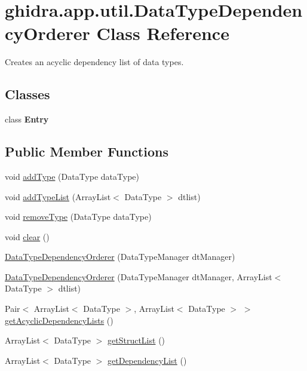 \hypertarget{classghidra_1_1app_1_1util_1_1_data_type_dependency_orderer}{}\section{ghidra.\+app.\+util.\+Data\+Type\+Dependency\+Orderer Class Reference}
\label{classghidra_1_1app_1_1util_1_1_data_type_dependency_orderer}


Creates an acyclic dependency list of data types.  


\subsection*{Classes}
\begin{DoxyCompactItemize}
\item 
class {\bfseries Entry}
\end{DoxyCompactItemize}
\subsection*{Public Member Functions}
\begin{DoxyCompactItemize}
\item 
void \mbox{\hyperlink{classghidra_1_1app_1_1util_1_1_data_type_dependency_orderer_ac1f0b4ed6ad0e2ad67bc755e210cf77a}{add\+Type}} (Data\+Type data\+Type)
\item 
void \mbox{\hyperlink{classghidra_1_1app_1_1util_1_1_data_type_dependency_orderer_aa655bed27103a787f66e486017a661c8}{add\+Type\+List}} (Array\+List$<$ Data\+Type $>$ dtlist)
\item 
void \mbox{\hyperlink{classghidra_1_1app_1_1util_1_1_data_type_dependency_orderer_a2bb52e75deb4e3b235cbe160374c5764}{remove\+Type}} (Data\+Type data\+Type)
\item 
void \mbox{\hyperlink{classghidra_1_1app_1_1util_1_1_data_type_dependency_orderer_a9059ee85fb81cb0aa66d60eee9759c1a}{clear}} ()
\item 
\mbox{\hyperlink{classghidra_1_1app_1_1util_1_1_data_type_dependency_orderer_a8a9f36b7968a8a518fd2225e9529c51d}{Data\+Type\+Dependency\+Orderer}} (Data\+Type\+Manager dt\+Manager)
\item 
\mbox{\hyperlink{classghidra_1_1app_1_1util_1_1_data_type_dependency_orderer_a65adfe63e1f711c5f3d13e6ed3ba3d40}{Data\+Type\+Dependency\+Orderer}} (Data\+Type\+Manager dt\+Manager, Array\+List$<$ Data\+Type $>$ dtlist)
\item 
Pair$<$ Array\+List$<$ Data\+Type $>$, Array\+List$<$ Data\+Type $>$ $>$ \mbox{\hyperlink{classghidra_1_1app_1_1util_1_1_data_type_dependency_orderer_a2dbdd7d069cf6999b722cada66e45a34}{get\+Acyclic\+Dependency\+Lists}} ()
\item 
Array\+List$<$ Data\+Type $>$ \mbox{\hyperlink{classghidra_1_1app_1_1util_1_1_data_type_dependency_orderer_a83bf4d498139bbcc653983e7d3fb6055}{get\+Struct\+List}} ()
\item 
Array\+List$<$ Data\+Type $>$ \mbox{\hyperlink{classghidra_1_1app_1_1util_1_1_data_type_dependency_orderer_abdf912e6b46418382ad23fb1d119dc62}{get\+Dependency\+List}} ()
\end{DoxyCompactItemize}


